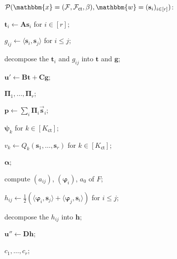\documentclass[../../book.tex]{subfiles}
\begin{document}
\begin{algoproto}[ht]
    \footnotesize
    \centering
    \setlength{\fboxsep}{1.5pt}
    \begin{mdframed}[linecolor=black, linewidth=1pt,
                     skipabove=10pt, skipbelow=10pt,
                     innerleftmargin=5pt, innerrightmargin=5pt]
        \begin{minipage}[t]{0.52\linewidth}
            \colorbox{oc-blue-1}{$\mathcal{P}(\mathbbm{x} = (\mathcal{F}, \mathcal{F}_{\mathsf{ct}}, \beta), \mathbbm{w} = (\mathbf{s}_i)_{i \in [r]})$:}
            \begin{algoen}
                \item $\mathbf{t}_i \gets \mathbf{A}\mathbf{s}_i$ for $i \in [r]$;
                \item $g_{ij} \gets \langle \mathbf{s}_i, \mathbf{s}_j \rangle$ for $i \leq j$;
                \item \colorbox{oc-orange-1}{decompose the $\mathbf{t}_i$ and $g_{ij}$ into $\mathbf{t}$ and $\mathbf{g}$;}
                \item {} \colorbox{oc-orange-1}{$\mathbf{u}' \gets \mathbf{B}\mathbf{t} + \mathbf{C}\mathbf{g}$};
                \item {} $\boldsymbol{\Pi}_1, \dots, \boldsymbol{\Pi}_r$;
                \item {} $\mathbf{p} \gets \sum_{i} \boldsymbol{\Pi}_i\vec{\mathbf{s}}_i$;
                \item {} $\boldsymbol{\psi}_k$ for $k \in [K_{\mathsf{ct}}]$;
                \item {} $v_k \gets Q_k(\mathbf{s}_1, \dots, \mathbf{s}_r)$ for $k \in [K_{\mathsf{ct}}]$;
                \item {} $\boldsymbol{\alpha}$;
                \item compute $(a_{ij})$, $(\boldsymbol{\varphi}_i)$, $a_0$ of $F$;
                \item $h_{ij} \gets \frac{1}{2}(\langle \boldsymbol{\varphi}_i, \mathbf{s}_j \rangle + \langle \boldsymbol{\varphi}_j, \mathbf{s}_i \rangle)$ for $i \leq j$;
                \item \colorbox{oc-orange-1}{decompose the $h_{ij}$ into $\mathbf{h}$;}
                \item {} \colorbox{oc-orange-1}{$\mathbf{u}'' \gets \mathbf{D}\mathbf{h}$};
                \item {} $c_1, \dots, c_r$;

\end{algoen}
\end{minipage}
\end{mdframed}
\end{algoproto}
\end{document}
